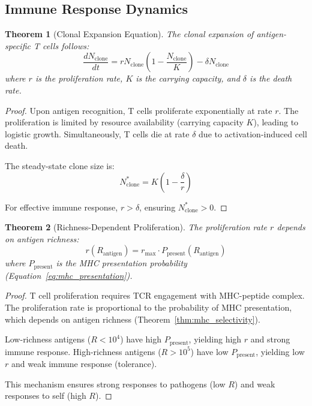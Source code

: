\documentclass[11pt,twocolumn,a4paper]{article}
\newtheorem{theorem}{Theorem}[section]
\theoremstyle{definition}
\theoremstyle{remark}
\begin{document}
\subsection{Immune Response Dynamics}

\begin{theorem}[Clonal Expansion Equation]
\label{thm:clonal_expansion}
The clonal expansion of antigen-specific T cells follows:
\begin{equation}
\frac{dN_{\mathrm{clone}}}{dt} = r N_{\mathrm{clone}} \left(1 - \frac{N_{\mathrm{clone}}}{K}\right) - \delta N_{\mathrm{clone}}
\label{eq:clonal_expansion}
\end{equation}
where $r$ is the proliferation rate, $K$ is the carrying capacity, and $\delta$ is the death rate.
\end{theorem}

\begin{proof}
Upon antigen recognition, T cells proliferate exponentially at rate $r$. The proliferation is limited by resource availability (carrying capacity $K$), leading to logistic growth. Simultaneously, T cells die at rate $\delta$ due to activation-induced cell death.

The steady-state clone size is:
\begin{equation}
N_{\mathrm{clone}}^* = K\left(1 - \frac{\delta}{r}\right)
\label{eq:steady_state_clone}
\end{equation}

For effective immune response, $r > \delta$, ensuring $N_{\mathrm{clone}}^* > 0$.
\end{proof}

\begin{theorem}[Richness-Dependent Proliferation]
\label{thm:richness_proliferation}
The proliferation rate $r$ depends on antigen richness:
\begin{equation}
r(R_{\mathrm{antigen}}) = r_{\max} \cdot P_{\mathrm{present}}(R_{\mathrm{antigen}})
\label{eq:richness_proliferation}
\end{equation}
where $P_{\mathrm{present}}$ is the MHC presentation probability (Equation~\eqref{eq:mhc_presentation}).
\end{theorem}

\begin{proof}
T cell proliferation requires TCR engagement with MHC-peptide complex. The proliferation rate is proportional to the probability of MHC presentation, which depends on antigen richness (Theorem~\ref{thm:mhc_selectivity}).

Low-richness antigens ($R < 10^4$) have high $P_{\mathrm{present}}$, yielding high $r$ and strong immune response. High-richness antigens ($R > 10^5$) have low $P_{\mathrm{present}}$, yielding low $r$ and weak immune response (tolerance).

This mechanism ensures strong responses to pathogens (low $R$) and weak responses to self (high $R$).
\end{proof}
\end{document}
